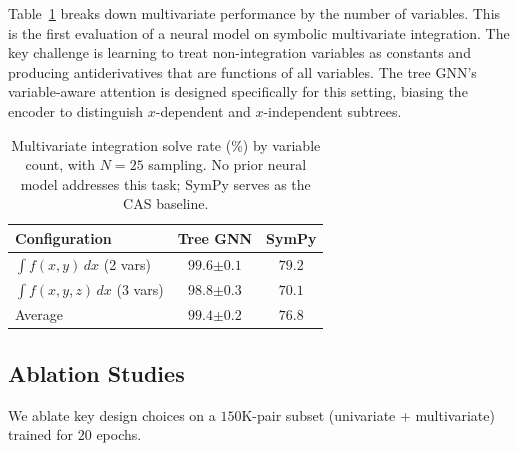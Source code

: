 \documentclass{article}
\begin{document}
Table~\ref{tab:multivar} breaks down multivariate performance by the
number of variables. This is the first evaluation of a neural model on
symbolic multivariate integration. The key challenge is learning to treat
non-integration variables as constants and producing antiderivatives that
are functions of all variables. The tree GNN's variable-aware attention is
designed specifically for this setting, biasing the encoder to distinguish
$x$-dependent and $x$-independent subtrees.

\begin{table}[t]
	\centering
	\caption{Multivariate integration solve rate (\%) by variable count,
		with $N\!=\!25$ sampling. No prior neural model addresses this
		task; SymPy serves as the CAS baseline.}
	\label{tab:multivar}
	\small
	\begin{tabular}{lcc}
		\toprule
		Configuration                & Tree GNN & SymPy \\
		\midrule
		$\int f(x,y)\,dx$ (2 vars)   & $\mathbf{99.6}{\scriptstyle\pm0.1}$ & $79.2$ \\
		$\int f(x,y,z)\,dx$ (3 vars) & $\mathbf{98.8}{\scriptstyle\pm0.3}$ & $70.1$ \\
		\midrule
		Average                      & $\mathbf{99.4}{\scriptstyle\pm0.2}$ & $76.8$ \\
		\bottomrule
	\end{tabular}
\end{table}


\subsection{Ablation Studies}
\label{sec:ablations}

We ablate key design choices on a $150$K-pair subset
(univariate + multivariate) trained for $20$ epochs.
\end{document}
